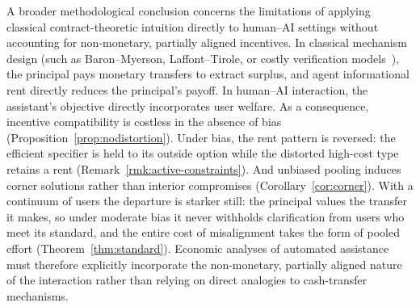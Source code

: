\documentclass[11pt]{article}
\begin{document}
A broader methodological conclusion concerns the limitations of applying classical contract-theoretic intuition directly to human--AI settings without accounting for non-monetary, partially aligned incentives. In classical mechanism design (such as Baron--Myerson, Laffont--Tirole, or costly verification models~\citep{baron-myerson1982,laffont-tirole1986,ben-porath2014}), the principal pays monetary transfers to extract surplus, and agent informational rent directly reduces the principal's payoff. In human--AI interaction, the assistant's objective directly incorporates user welfare. As a consequence, incentive compatibility is costless in the absence of bias (Proposition~\ref{prop:nodistortion}). Under bias, the rent pattern is reversed: the efficient specifier is held to its outside option while the distorted high-cost type retains a rent (Remark~\ref{rmk:active-constraints}). And unbiased pooling induces corner solutions rather than interior compromises (Corollary~\ref{cor:corner}). With a continuum of users the departure is starker still: the principal values the transfer it makes, so under moderate bias it never withholds clarification from users who meet its standard, and the entire cost of misalignment takes the form of pooled effort (Theorem~\ref{thm:standard}). Economic analyses of automated assistance must therefore explicitly incorporate the non-monetary, partially aligned nature of the interaction rather than relying on direct analogies to cash-transfer mechanisms.
\end{document}
